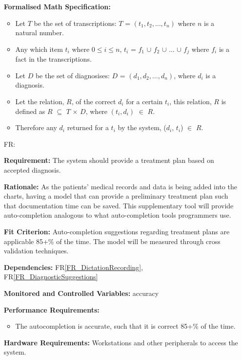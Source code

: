 \documentclass[12pt]{article}
\newcounter{reqnum} %
\begin{document}
\begin{itemize}
  \textbf{Formalised Math Specification:}
    \begin{itemize}
      \item Let $T$ be the set of transcriptions: $T$ = $(t_1, t_2, \ldots, t_n)$ where $n$ is a natural number.
      \item Any which item $t_i$ where $0 \leq i \leq n$, $t_i$ = $f_1$ $\cup$ $f_2$ $\cup$ $\ldots$ $\cup$ $f_j$ where $f_i$ is a fact in the transcriptions.
      \item Let $D$ be the set of diagnosises: $D$ = $(d_1, d_2, \ldots, d_n)$, where $d_i$ is a diagnosis.
      \item Let the relation, $R$, of the correct $d_i$ for a certain $t_i$, this relation, $R$ is defined as $R$ $\subseteq$ $T$ $\times$ $D$, where $(t_i, d_i)$ $\in$ $R$.
      \item Therefore any $d_i$ returned for a $t_i$ by the system, ($d_i$, $t_i$) $\in$ $R$.
    \end{itemize}
  
  
  \item[FR\refstepcounter{reqnum}\thereqnum \label{FR_medicalSuggestions}:] 
  
  \textbf{Requirement:} The system should provide a treatment plan based on accepted diagnosis.
  
  \textbf{Rationale:} As the patients' medical records and data is being added into the charts, having a model that can provide a preliminary treatment plan such that documentation time can be saved. This supplementary tool will provide auto-completion analogous to what auto-completion tools programmers use.
  
  \textbf{Fit Criterion:} Auto-completion suggestions regarding treatment plans are applicable 85+\% of the time. The model will be measured through cross validation techniques.
   
  \textbf{Dependencies:} FR\ref{FR_DictationRecording}, FR\ref{FR_DiagnosticSuggestions}
  
  \textbf{Monitored and Controlled Variables:} accuracy
  
  \textbf{Performance Requirements:}
  \begin{itemize}
    \item The autocompletion is accurate, such that it is correct 85+\% of the time. 
  \end{itemize}
  
  \textbf{Hardware Requirements:} 
  Workstations and other peripherals to access the system.
  

\end{itemize}
\end{document}
